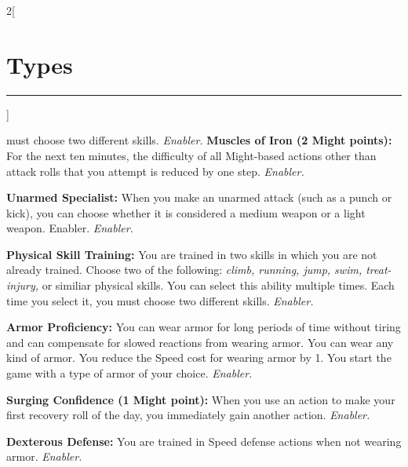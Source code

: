 \documentclass[a4paper,10pt,final]{book}
\newcommand{\HRule}{\rule{\linewidth}{0.5mm}} %
\newcommand{\newSection}[1]{\section*{#1} \addcontentsline{toc}{section}{#1} \label{sec:#1} \HRule}
\newcommand{\itemAbility}[2]{\textcolor{25gray}{\textbullet\textbf{ #1:}} {#2}\par}
\newcommand{\enabler}{\textit{ Enabler.}}
\newenvironment{docsection}[1]
{
  \begin{multicols*}{2}[\newSection{#1}]
}
{
  \end{multicols*}
  \newpage
}
\begin{document}
\begin{docsection}{Types}
{must choose two different skills.\enabler}
\itemAbility{Muscles of Iron (2 Might points)}{For the
next ten minutes, the difficulty of all Might-based
actions other than attack rolls that
you attempt is reduced by one step.\enabler}
\itemAbility{Unarmed Specialist}{When you make
an unarmed attack (such as a punch
or kick), you can choose whether it is considered a medium weapon or a light
weapon. Enabler.\enabler}
\itemAbility{Physical Skill Training}{You are trained in two
skills in which you are not already trained.
Choose two of the following: \textit{climb, running, jump, swim, treat-injury,} or similiar physical skills.
You can select this ability multiple times.
Each time you select it, you must choose
two different skills.\enabler} 
\itemAbility{Armor Proficiency}{You can wear armor
for long periods of time without tiring
and can compensate for slowed reactions
from wearing armor. You can wear any kind
of armor. You reduce the Speed cost for
wearing armor by 1. You start the game with
a type of armor of your choice.\enabler}
\itemAbility{Surging Confidence (1 Might point)}{When you use an action to make your first
recovery roll of the day, you immediately
gain another action.\enabler}
\itemAbility{Dexterous Defense}{You are trained
in Speed defense actions when not wearing
armor.\enabler}


\end{docsection}
\end{document}
